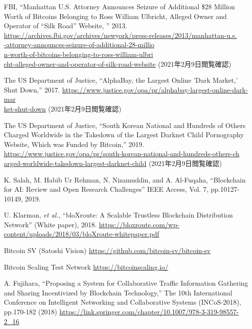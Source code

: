 \documentclass[graybox]{svmult}
\begin{document}
\begin{thebibliography}{99}
  FBI, 
  ``Manhattan U.S. Attorney Announces Seizure of Additional \$28 Million 
    Worth of Bitcoins Belonging to Ross William Ulbricht, Alleged Owner 
    and Operator of ``Silk Road'' Website, '' 2013.
  \url{https://archives.fbi.gov/archives/newyork/press-releases/2013/manhattan-u.s.}\\
  \url{-attorney-announces-seizure-of-additional-28-millio}\\
  \url{n-worth-of-bitcoins-belonging-to-ross-william-ulbri}\\
  \url{cht-alleged-owner-and-operator-of-silk-road-website}
  (2021年2月9日閲覧確認)

  The US Department of Justice,
  ``AlphaBay, the Largest Online 'Dark Market,' Shut Down,'' 2017.
  \url{https://www.justice.gov/opa/pr/alphabay-largest-online-dark-mar}\\
  \url{ket-shut-down}
  (2021年2月9日閲覧確認)

  The US Department of Justice,
  ``South Korean National and Hundreds of Others Charged Worldwide in the Takedown 
    of the Largest Darknet Child Pornography Website, Which was Funded by Bitcoin,'' 
  2019.
  \url{https://www.justice.gov/opa/pr/south-korean-national-and-hundreds-others-ch}\\
  \url{arged-worldwide-takedown-largest-darknet-child}
  (2021年2月9日閲覧確認)


  K. Salah, M. Habib Ur Rehman, N. Nizamuddin, and A. Al-Fuqaha,
  ``Blockchain for AI: Review and Open Research Challenges''
  IEEE Access, Vol. 7, pp.10127-10149, 2019.


  U. Klarman, \textit{et al.},
  ``bloXroute: A Scalable Trustless Blockchain Distribution Network''
  (White paper), 2018.
  \url{https://bloxroute.com/wp-content/uploads/2018/03/bloXroute-whitepaper.pdf}


  Bitcoin SV (Satoshi Vision) 
  \url{https://github.com/bitcoin-sv/bitcoin-sv}

  Bitcoin Scaling Test Network
  \url{https://bitcoinscaling.io/}


  A. Fujihara,
  ``Proposing a System for Collaborative Traffic Information Gathering and 
  Sharing Incentivized by Blockchain Technology,''
  The 10th International Conference on Intelligent Networking and 
  Collaborative Systems (INCoS-2018), pp.170-182 (2018)
  \url{https://link.springer.com/chapter/10.1007/978-3-319-98557-2_16}


\end{thebibliography}
\end{document}
